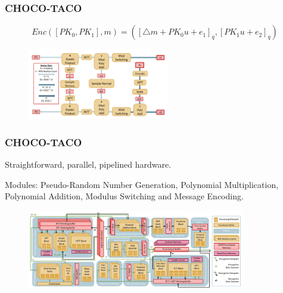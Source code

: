 \documentclass[10pt,handout]{beamer}
\begin{document}
\begin{frame}
\frametitle{CHOCO-TACO}
\begin{equation}
    Enc([PK_0,PK_1],m) = ([\triangle m + PK_0u+e_1]_q, [PK_1u+e_2]_q)
\end{equation}

\begin{figure}
    \includegraphics[width=0.55\textwidth]{pipeline.png}
\end{figure}



\end{frame}


\begin{frame}
\frametitle{CHOCO-TACO}
 Straightforward, parallel, pipelined hardware.

 Modules: Pseudo-Random Number Generation, Polynomial Multiplication, Polynomial Addition, Modulus Switching and Message Encoding.


\begin{figure}
    \includegraphics[width=0.85\textwidth]{architecture.png}
\end{figure}


\end{frame}


\end{document}
